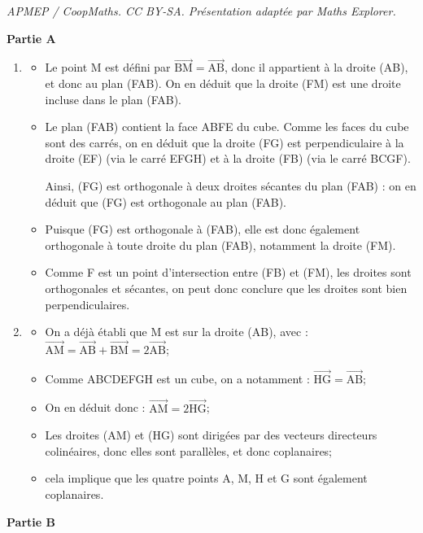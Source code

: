 \documentclass[10pt]{article}
\providecommand{\vectt}[1]{\overrightarrow{\mathrm{#1}}}
\begin{document}
\noindent\textit{APMEP / CoopMaths. CC BY-SA. Présentation adaptée par Maths Explorer.}\par\medskip
\medskip

\textbf{Partie A}

\medskip

\begin{enumerate}
\item 
\begin{itemize}
\item Le point M est défini par $\vectt{BM} = \vectt{AB}$, donc il appartient à la droite (AB), et donc au plan (FAB). On en déduit que la droite (FM) est une droite incluse dans le plan (FAB).
\item Le plan (FAB) contient la face ABFE du cube. Comme les faces du cube sont des carrés, on en déduit que la droite (FG) est perpendiculaire  à la droite (EF) (via le carré EFGH) et à la droite (FB) (via le carré BCGF).

Ainsi, (FG) est orthogonale à deux droites sécantes du plan (FAB) : on en déduit que (FG) est orthogonale au plan (FAB).
\item Puisque (FG) est orthogonale à (FAB), elle est donc également orthogonale à toute droite du plan (FAB), notamment la droite (FM).
\item Comme F est un point d'intersection entre (FB) et (FM), les droites sont orthogonales et sécantes, on peut donc conclure que les droites sont bien perpendiculaires.
		\end{itemize}

\item 
\begin{itemize}
\item On a déjà établi que M est sur la droite (AB), avec : $\vectt{AM} = \vectt{AB} + \vectt{BM} = 2\vectt{AB}$;
\item Comme ABCDEFGH est un cube, on a notamment : $\vectt{HG} = \vectt{AB}$;
\item On en déduit donc : \quad $\vectt{AM} = 2\vectt{HG}$;
\item Les droites (AM) et (HG) sont dirigées par des vecteurs directeurs colinéaires, donc elles sont parallèles, et donc coplanaires;
\item cela implique que les quatre points A, M, H et G sont également coplanaires.
\end{itemize}
\end{enumerate}

\medskip

\textbf{Partie B}
\end{document}
